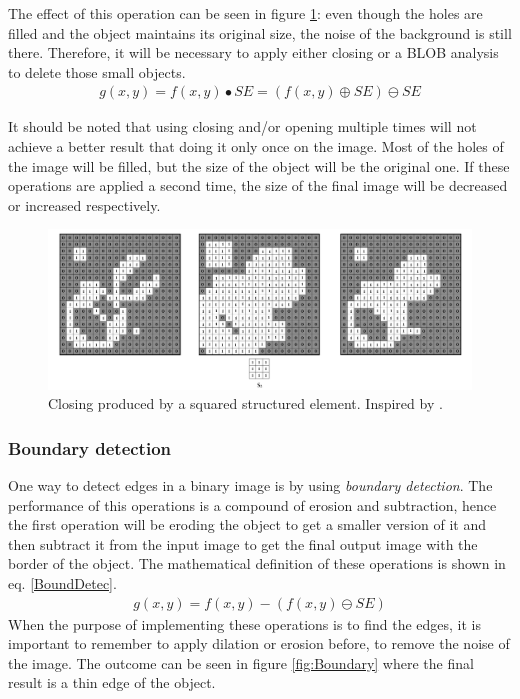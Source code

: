 The effect of this operation can be seen in figure \ref{fig:Closing}: even though the holes are filled and the object maintains its original size, the noise of the background is still there. Therefore, it will be necessary to apply either closing or a BLOB analysis to delete those small objects.
\begin{equation}
\begin{aligned}
{g(x,y)}={f(x,y)}\bullet{SE}=({f(x,y)}\oplus{SE})\ominus{SE}
\label{Closing}
	\end{aligned}
\end{equation}

It should be noted that using closing and/or opening multiple times will not achieve a better result that doing it only once on the image. Most of the holes of the image will be filled, but the size of the object will be the original one. If these operations are applied a second time, the size of the final image will be decreased or increased respectively.

\begin{figure}[htbp]
\centering
\includegraphics[width=1\textwidth]{Pictures/Theory/ClosingSq.png}
\caption{Closing produced by a squared structured element. Inspired by \citep{ip_book}.}
\label{fig:Closing}
\end{figure}

\subsubsection{Boundary detection}
One way to detect edges in a binary image is by using \textit{boundary detection}. The performance of this operations is a compound of erosion and subtraction, hence the first operation will be eroding the object to get a smaller version of it and then subtract it from the input image to get the final output image with the border of the object. The mathematical definition of these operations is shown in eq. \ref{BoundDetec}.
\begin{equation}
\begin{aligned}
{g(x,y)}={f(x,y)}-({f(x,y)}\ominus{SE})
\label{BoundDetec}
	\end{aligned}
\end{equation}
When the purpose of implementing these operations is to find the edges, it is important to remember to apply dilation or erosion before, to remove the noise of the image. The outcome can be seen in figure \ref{fig:Boundary} where the final result is a thin edge of the object.

